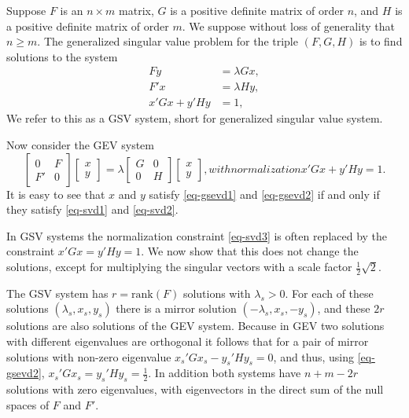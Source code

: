 \documentclass[
  12pt,
  letterpaper,
  DIV=11,
  numbers=noendperiod]{scrartcl}
\begin{document}
Suppose \(F\) is an \(n\times m\) matrix, \(G\) is a positive definite
matrix of order \(n\), and \(H\) is a positive definite matrix of order
\(m\). We suppose without loss of generality that \(n\geq m\). The
generalized singular value problem for the triple \((F,G,H)\) is to find
solutions to the system \begin{subequations}
\begin{align}
Fy&=\lambda Gx,\label{eq-svd1}\\
F'x&=\lambda Hy,\label{eq-svd2}\\
x'Gx+y'Hy&=1,\label{eq-svd3}
\end{align}
\end{subequations} We refer to this as a GSV system, short for
generalized singular value system.

Now consider the GEV system \begin{subequations}
\begin{equation}
\begin{bmatrix}
0&F\\
F'&0
\end{bmatrix}
\begin{bmatrix}
x\\y
\end{bmatrix}
=\lambda
\begin{bmatrix}
G&0\\
0&H
\end{bmatrix}
\begin{bmatrix}
x\\y
\end{bmatrix}\label{eq-gsevd1},
\end{equation}
with normalization
\begin{equation}
x'Gx+y'Hy=1.
\end{equation}\label{eq-gsevd2}
\end{subequations} It is easy to see that \(x\) and \(y\) satisfy
\eqref{eq-gsevd1} and \eqref{eq-gsevd2} if and only if they satisfy
\eqref{eq-svd1} and \eqref{eq-svd2}.

In GSV systems the normalization constraint \eqref{eq-svd3} is often
replaced by the constraint \(x'Gx=y'Hy=1\). We now show that this does
not change the solutions, except for multiplying the singular vectors
with a scale factor \(\frac12\sqrt{2}\).

The GSV system has \(r=\text{rank}(F)\) solutions with \(\lambda_s>0\).
For each of these solutions \((\lambda_s,x_s,y_s)\) there is a mirror
solution \((-\lambda_s,x_s,-y_s)\), and these \(2r\) solutions are also
solutions of the GEV system. Because in GEV two solutions with different
eigenvalues are orthogonal it follows that for a pair of mirror
solutions with non-zero eigenvalue \(x_s'Gx_s-y_s'Hy_s=0\), and thus,
using \eqref{eq-gsevd2}, \(x_s'Gx_s=y_s'Hy_s=\frac12\). In addition both
systems have \(n+m-2r\) solutions with zero eigenvalues, with
eigenvectors in the direct sum of the null spaces of \(F\) and \(F'\).
\end{document}
